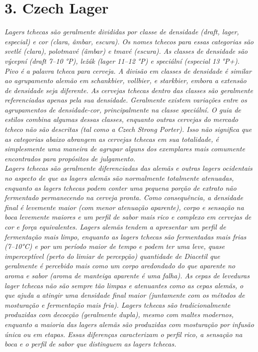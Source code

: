 \section*{3. Czech Lager}
\textit{Lagers tchecas são geralmente divididas por classe de densidade (draft, lager, especial) e cor (clara, âmbar, escura). Os nomes tchecos para essas categorias são svetlé (clara), polotmavé (âmbar) e tmavé (escura). As classes de densidade são výcepní (draft 7–10 °P), ležák (lager 11–12 °P) e speciální (especial 13 °P+). Pivo é a palavra tcheca para cerveja. A divisão em classes de densidade é similar ao agrupamento alemão em schankbier, vollbier, e starkbier, embora a extensão de densidade seja diferente. As cervejas tchecas dentro das classes são geralmente referenciadas apenas pela sua densidade. Geralmente existem variações entre os agrupamentos de densidade-cor, principalmente na classe speciální. O guia de estilos combina algumas dessas classes, enquanto outras cervejas do mercado tcheco não são descritas (tal como a Czech Strong Porter). Isso não significa que as categorias abaixo abrangem as cervejas tchecas em sua totalidade, é simplesmente uma maneira de agrupar alguns dos exemplares mais comumente encontrados para propósitos de julgamento. \\
Lagers tchecas são geralmente diferenciadas das alemãs e outras lagers ocidentais no aspecto de que as lagers alemãs são normalmente totalmente atenuadas, enquanto as lagers tchecas podem conter uma pequena porção de extrato não fermentado permanecendo na cerveja pronta. Como consequência, a densidade final é levemente maior (com menor atenuação aparente), corpo e sensação na boca levemente maiores e um perfil de sabor mais rico e complexo em cervejas de cor e força equivalentes. Lagers alemãs tendem a apresentar um perfil de fermentação mais limpo, enquanto as lagers tchecas são fermentadas mais frias (7–10°C) e por um período maior de tempo e podem ter uma leve, quase imperceptível (perto do limiar de percepção) quantidade de Diacetil que geralmente é percebido mais como um corpo aredondado do que aparente no aroma e sabor (aroma de manteiga aparente é uma falha). As cepas de leveduras lager tchecas não são sempre tão limpas e atenuantes como as cepas alemãs, o que ajuda a atingir uma densidade final maior (juntamente com os métodos de mosturação e fermentação mais fria). Lagers tchecas são tradicionalmente produzidas com decocção (geralmente dupla), mesmo com maltes modernos, enquanto a maioria das lagers alemãs são produzidas com mosturação por infusão única ou em etapas. Essas diferenças caracterizam o perfil rico, a sensação na boca e o perfil de sabor que distinguem as lagers tchecas.}
